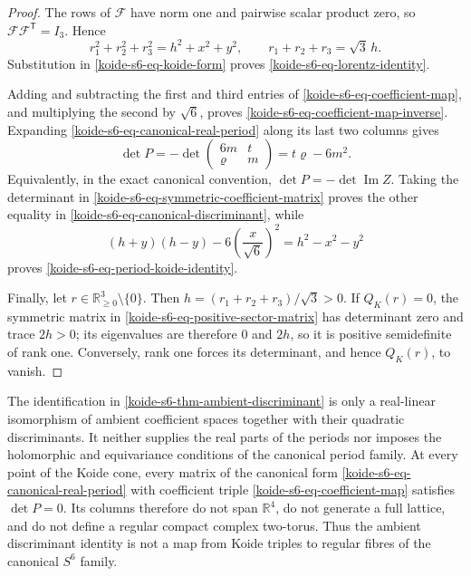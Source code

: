 \begin{proof}
The rows of \(\mathcal F\) have norm one and pairwise scalar product zero,
so \(\mathcal F\mathcal F^{\mathsf T}=I_3\).  Hence
\[
 r_1^2+r_2^2+r_3^2=h^2+x^2+y^2,
 \qquad r_1+r_2+r_3=\sqrt3\,h.
\]
Substitution in \cref{koide-s6-eq-koide-form} proves
\cref{koide-s6-eq-lorentz-identity}.

Adding and subtracting the first and third entries of
\cref{koide-s6-eq-coefficient-map}, and multiplying the second by
\(\sqrt6\), proves \cref{koide-s6-eq-coefficient-map-inverse}.  Expanding
\cref{koide-s6-eq-canonical-real-period} along its last two columns gives
\[
 \det P
 =-\det\begin{pmatrix}6m&t\\\varrho&m\end{pmatrix}
 =t\varrho-6m^2.
\]
Equivalently, in the exact canonical convention,
\(\det P=-\det\operatorname{Im}Z\).  Taking the determinant in
\cref{koide-s6-eq-symmetric-coefficient-matrix} proves the other equality
in \cref{koide-s6-eq-canonical-discriminant}, while
\[
 (h+y)(h-y)-6\left(\frac{x}{\sqrt6}\right)^2
 =h^2-x^2-y^2
\]
proves \cref{koide-s6-eq-period-koide-identity}.

Finally, let \(r\in\mathbb R_{\geq0}^3\setminus\{0\}\).  Then
\(h=(r_1+r_2+r_3)/\sqrt3>0\).  If \(Q_K(r)=0\), the symmetric matrix in
\cref{koide-s6-eq-positive-sector-matrix} has determinant zero and trace
\(2h>0\); its eigenvalues are therefore \(0\) and \(2h\), so it is positive
semidefinite of rank one.  Conversely, rank one forces its determinant,
and hence \(Q_K(r)\), to vanish.
\end{proof}

\begin{corollary}
\label{koide-s6-cor-ambient-only}
The identification in
\cref{koide-s6-thm-ambient-discriminant} is only a real-linear isomorphism
of ambient coefficient spaces together with their quadratic discriminants.
It neither supplies the real parts of the periods nor imposes the
holomorphic and equivariance conditions of the canonical period family.
At every point of the Koide cone, every matrix of the canonical form
\cref{koide-s6-eq-canonical-real-period} with coefficient triple
\cref{koide-s6-eq-coefficient-map} satisfies \(\det P=0\).  Its columns
therefore do not span \(\mathbb R^4\), do not generate a full lattice, and
do not define a regular compact complex two-torus.  Thus the ambient
discriminant identity is not a map from Koide triples to regular fibres of
the canonical \(S^6\) family.
\end{corollary}

